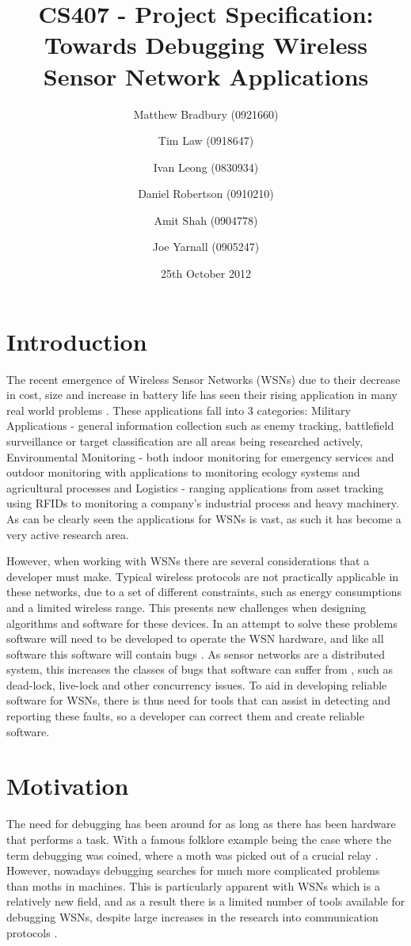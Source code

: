 \documentclass[a4paper]{article}
\title{CS407 - Project Specification:\\
Towards Debugging Wireless Sensor Network Applications}
\date{25th October 2012}
\author{
	Matthew Bradbury (0921660) \and
	Tim Law (0918647) \and
	Ivan Leong (0830934) \and
	Daniel Robertson (0910210) \and
	Amit Shah (0904778) \and
	Joe Yarnall (0905247)
}
\begin{document}
\maketitle

\pagestyle{empty}
\thispagestyle{empty}

\newpage

\pagestyle{plain}
\setcounter{page}{1}

\tableofcontents
\clearpage


\section{Introduction}
The recent emergence of Wireless Sensor Networks (WSNs) due to their decrease in
cost, size and increase in battery life has seen their rising application in
many real world problems \cite{wsnapps}. These applications fall into 3
categories: Military Applications - general information collection such as enemy
tracking, battlefield surveillance or target classification are all areas being
researched actively, Environmental Monitoring - both indoor monitoring for
emergency services and outdoor monitoring with applications to monitoring
ecology systems and agricultural processes and Logistics - ranging applications
from asset tracking using RFIDs to monitoring a company's industrial process and
heavy machinery. As can be clearly seen the applications for WSNs is vast, as
such it has become a very active research area.

However, when working with WSNs there are several considerations that a
developer must make. Typical wireless protocols are not practically
applicable in these networks, due to a set of different constraints, such as
energy consumptions and a limited wireless range. This presents new challenges
when designing algorithms and software for these devices. In an attempt to solve
these problems software will need to be developed to operate the WSN hardware,
and like all software this software will contain bugs \cite{5010224}. As sensor
networks are a distributed system, this increases the classes of bugs that
software can suffer from \cite{5010224}, such as dead-lock, live-lock and other
concurrency issues. To aid in developing reliable software for WSNs, there is
thus need for tools that can assist in detecting and reporting these faults, so
a developer can correct them and create reliable software.

\section{Motivation}
The need for debugging has been around for as long as there has been hardware
that performs a task. With a famous folklore example being the case where the
term debugging was coined, where a moth was picked out of a crucial relay
\cite{shapiro1987etymology}. However, nowadays debugging searches for much more
complicated problems than moths in machines. This is particularly apparent with
WSNs which is a relatively new field, and as a result there is a limited number
of tools available for debugging WSNs, despite large increases in the research
into communication protocols \cite{TankBible}. 
\end{document}
